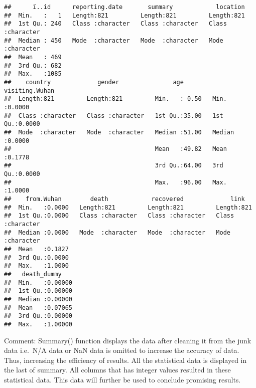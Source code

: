 \documentclass[
]{article}
\newenvironment{Shaded}{\begin{snugshade}}{\end{snugshade}}
\newcommand{\AttributeTok}[1]{\textcolor[rgb]{0.77,0.63,0.00}{#1}}
\newcommand{\CommentTok}[1]{\textcolor[rgb]{0.56,0.35,0.01}{\textit{#1}}}
\newcommand{\DecValTok}[1]{\textcolor[rgb]{0.00,0.00,0.81}{#1}}
\newcommand{\FunctionTok}[1]{\textcolor[rgb]{0.00,0.00,0.00}{#1}}
\newcommand{\NormalTok}[1]{#1}
\newcommand{\OtherTok}[1]{\textcolor[rgb]{0.56,0.35,0.01}{#1}}
\newcommand{\SpecialCharTok}[1]{\textcolor[rgb]{0.00,0.00,0.00}{#1}}
\newcommand{\StringTok}[1]{\textcolor[rgb]{0.31,0.60,0.02}{#1}}
\begin{document}
\begin{verbatim}
##      ï..id      reporting.date       summary            location        
##  Min.   :   1   Length:821         Length:821         Length:821        
##  1st Qu.: 240   Class :character   Class :character   Class :character  
##  Median : 450   Mode  :character   Mode  :character   Mode  :character  
##  Mean   : 469                                                           
##  3rd Qu.: 682                                                           
##  Max.   :1085                                                           
##    country             gender               age        visiting.Wuhan  
##  Length:821         Length:821         Min.   : 0.50   Min.   :0.0000  
##  Class :character   Class :character   1st Qu.:35.00   1st Qu.:0.0000  
##  Mode  :character   Mode  :character   Median :51.00   Median :0.0000  
##                                        Mean   :49.82   Mean   :0.1778  
##                                        3rd Qu.:64.00   3rd Qu.:0.0000  
##                                        Max.   :96.00   Max.   :1.0000  
##    from.Wuhan        death            recovered             link          
##  Min.   :0.0000   Length:821         Length:821         Length:821        
##  1st Qu.:0.0000   Class :character   Class :character   Class :character  
##  Median :0.0000   Mode  :character   Mode  :character   Mode  :character  
##  Mean   :0.1827                                                           
##  3rd Qu.:0.0000                                                           
##  Max.   :1.0000                                                           
##   death_dummy     
##  Min.   :0.00000  
##  1st Qu.:0.00000  
##  Median :0.00000  
##  Mean   :0.07065  
##  3rd Qu.:0.00000  
##  Max.   :1.00000
\end{verbatim}

Comment: Summary() function displays the data after cleaning it from the
junk data i.e.~N/A data or NaN data is omitted to increase the accuracy
of data. Thus, increasing the efficiency of results. All the statistical
data is displayed in the last of summary. All columns that has integer
values resulted in these statistical data. This data will further be
used to conclude promising results.

\begin{Shaded}
\end{Shaded}
\end{document}
